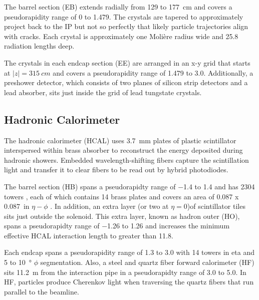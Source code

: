 \documentclass[12pt]{article}
\begin{document}
    The barrel section (EB) extends radially from \num{129} to \SI{177}{cm} and covers a pseudorapidity range of \num{0} to \num{1.479}. The crystals are tapered to approximately project back to the IP but not so perfectly that likely particle trajectories align with cracks. Each crystal is approximately one Moli\`ere radius wide and 25.8 radiation lengths deep.

    The crystals in each endcap section (EE) are arranged in an x-y grid that starts at $\lvert z \rvert = \SI{315}{cm}$ and covers a pseudorapidity range of \num{1.479} to \num{3.0}. Additionally, a preshower detector, which consists of two planes of silicon strip detectors and a lead absorber, sits just inside the grid of lead tungstate crystals. 

\subsection{Hadronic Calorimeter}
    The hadronic calorimeter (HCAL) uses \SI{3.7}{mm} plates of plastic scintillator interspersed within brass absorber to reconstruct the energy deposited during hadronic showers. Embedded wavelength-shifting fibers capture the scintillation light and transfer it to clear fibers to be read out by hybrid photodiodes.

    The barrel section (HB) spans a pseudorapidty range of \num{-1.4} to \num{1.4} and has \num{2304} towers , each of which contains \num{14}  brass plates and covers an area of \num{0.087} x \SI{0.087}{in} $\eta-\phi$ . In addition, an extra layer (or two at $\eta = \num{0}$)of scintillator tiles sits just outside the solenoid. This extra layer, known as hadron outer (HO), spans a pseudorapidty range of \num{-1.26} to \num{1.26} and increases the minimum effective HCAL interaction length to greater than \num{11.8}.

    Each endcap spans a pseudorapidity range of \num{1.3} to \num{3.0} with \num{14} towers in eta and \num{5} to \SI{10}{\degree} $\phi$ segmentation. Also, a steel and quartz fiber forward calorimeter (HF) sits \SI{11.2}{m} from the interaction pipe in a pseudorapidty range of \num{3.0} to \num{5.0}. In HF, particles produce Cherenkov light when traversing the quartz fibers that run parallel to the beamline. 
\end{document}
